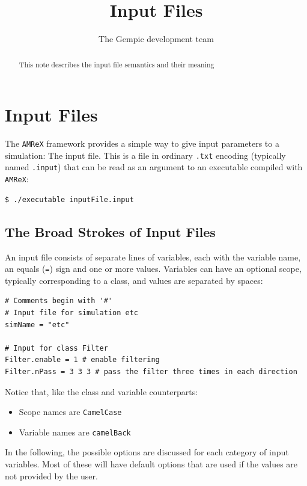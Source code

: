 \documentclass[11pt]{article}
\title{Input Files}
\author[1]{The Gempic development team}
\affil[1]{Max-Planck-Institut f\"ur Plasmaphysik, Garching, Germany}
\newcommand{\amrex}{\texttt{AMReX}}
\begin{document}
\maketitle

\begin{abstract}
This note describes the input file semantics and their meaning
\end{abstract}

\tableofcontents

\section{Input Files}
The \amrex{} framework provides a simple way to give input parameters to a simulation: The input file. This is a file in ordinary \verb|.txt| encoding (typically named \verb|.input|) that can be read as an argument to an executable compiled with \amrex:
\begin{lstlisting}[language=sh]
   $ ./executable inputFile.input 
\end{lstlisting}

\subsection{The Broad Strokes of Input Files}
An input file consists of separate lines of variables, each with the variable name, an equals (\verb|=|) sign and one or more values. Variables can have an optional scope, typically corresponding to a class, and values are separated by spaces:
\begin{lstlisting}[language=pkgconfig]
# Comments begin with '#'
# Input file for simulation etc
simName = "etc"

# Input for class Filter
Filter.enable = 1 # enable filtering
Filter.nPass = 3 3 3 # pass the filter three times in each direction
\end{lstlisting}
%
Notice that, like the class and variable counterparts:
\begin{itemize}
    \item Scope names are \verb|CamelCase|
    \item Variable names are \verb|camelBack|
\end{itemize}
%
In the following, the possible options are discussed for each category of input variables. Most of these will have default options that are used if the values are not provided by the user.
\end{document}
